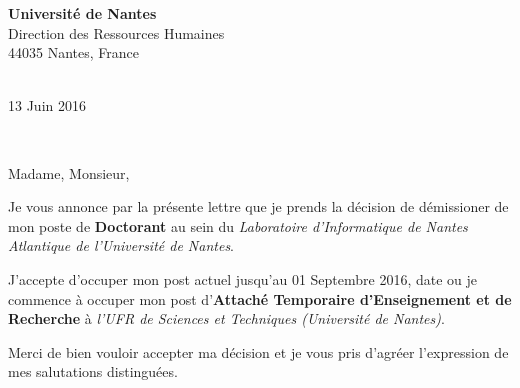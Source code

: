 \documentclass[11pt,a4paper]{letter} %
\def\opening#1{\thispagestyle{empty}
{\centering\fromaddress \vspace{0.6in} \\ %
\hspace{6cm}13 Juin 2016\hspace*{\fill}\par} %
{\raggedright \toname \\ \toaddress \par} %
\vspace{0.4in} %
\noindent #1 %
}
\begin{document}

\begin{letter}
{{\bf Université de Nantes}\\
Direction des Ressources Humaines\\
44035 Nantes, France\\
}


\opening{Madame, Monsieur,}

Je vous annonce par la présente lettre que je prends la décision de démissioner de mon poste de \textbf{Doctorant} au sein du \textit{Laboratoire d'Informatique de Nantes Atlantique de l'Université de Nantes}.

J'accepte d'occuper mon post actuel jusqu'au 01 Septembre 2016, date ou je commence à occuper mon post d'\textbf{Attaché Temporaire d'Enseignement et de Recherche} à \textit{l'UFR de Sciences et Techniques (Université de Nantes)}. 

Merci de bien vouloir accepter ma décision et je vous pris d'agréer l'expression de mes salutations distinguées.




\end{letter}
\end{document}
